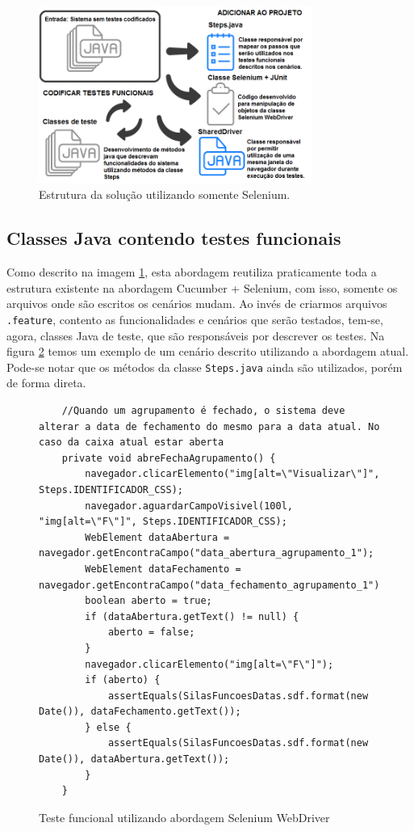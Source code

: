 \documentclass[tg]{mdtufsm}
\begin{document}
\begin{figure}[!htb]
	\centering
	\includegraphics[width=0.8\textwidth]{solucao3}
	\caption{Estrutura da solução utilizando somente Selenium.}
	\label{fig:solucao3}
\end{figure}

\subsection{Classes Java contendo testes funcionais}
Como descrito na imagem \ref{fig:solucao3}, esta abordagem reutiliza praticamente toda a estrutura existente na abordagem Cucumber + Selenium, com isso, somente os arquivos onde são escritos os cenários mudam. Ao invés de criarmos arquivos \texttt{.feature}, contento as funcionalidades e cenários que serão testados, tem-se, agora, classes Java de teste, que são responsáveis por descrever os testes.
Na figura \ref{code:seleniumTeste} temos um exemplo de um cenário descrito utilizando a abordagem atual.  Pode-se notar que os métodos da classe \texttt{Steps.java} ainda são utilizados, porém de forma direta.

\begin{figure}[!htt]
	\begin{lstlisting}
	//Quando um agrupamento é fechado, o sistema deve alterar a data de fechamento do mesmo para a data atual. No caso da caixa atual estar aberta
	private void abreFechaAgrupamento() {
		navegador.clicarElemento("img[alt=\"Visualizar\"]", Steps.IDENTIFICADOR_CSS);
		navegador.aguardarCampoVisivel(100l, "img[alt=\"F\"]", Steps.IDENTIFICADOR_CSS);
		WebElement dataAbertura = navegador.getEncontraCampo("data_abertura_agrupamento_1");
		WebElement dataFechamento = navegador.getEncontraCampo("data_fechamento_agrupamento_1");
		boolean aberto = true;
		if (dataAbertura.getText() != null) {
			aberto = false;
		}
		navegador.clicarElemento("img[alt=\"F\"]");
		if (aberto) {
			assertEquals(SilasFuncoesDatas.sdf.format(new Date()), dataFechamento.getText());
		} else {
			assertEquals(SilasFuncoesDatas.sdf.format(new Date()), dataAbertura.getText());
		}
	}	
	\end{lstlisting}
	\caption{Teste funcional utilizando abordagem Selenium WebDriver}
	\label{code:seleniumTeste}
\end{figure}
\end{document}
